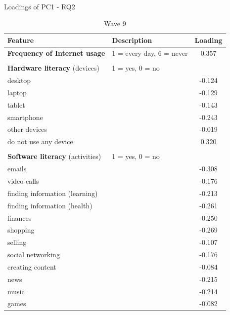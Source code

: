 \begin{table}
        \centering
        \caption{Loadings of PC1 - RQ2}
        \label{tab:pc1_loadings_rq2}
    
        \begin{subtable}[t]{0.4\textwidth}
            \centering
            \scriptsize
            \caption{Wave 9}
            \label{tab:pc1_loadings_w9_rq2}
            \begin{tabular}{llc}
                \toprule
                Feature & Description & Loading \\
                \midrule
                \textbf{Frequency of Internet usage} & 1 = every day, 6 = never & 0.357 \\
                & & \\
                \textbf{Hardware literacy} (devices) & 1 = yes, 0 = no & \\
                desktop &  & -0.124 \\
                laptop &  & -0.129 \\
                tablet &  & -0.143 \\
                smartphone &  & -0.243 \\
                other devices &  & -0.019 \\
                do not use any device &  & 0.320 \\
                & & \\
                \textbf{Software literacy} (activities) & 1 = yes, 0 = no & \\
                emails &  & -0.308 \\
                video calls &  & -0.176 \\
                finding information (learning) &  & -0.213 \\
                finding information (health) &  & -0.261 \\
                finances &  & -0.250 \\
                shopping &  & -0.269 \\
                selling &  & -0.107 \\
                social networking &  & -0.176 \\
                creating content &  & -0.084 \\
                news &  & -0.215 \\
                music &  & -0.214 \\
                games &  & -0.082 \\

\end{tabular}
\end{subtable}
\end{table}
